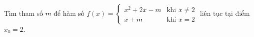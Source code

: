 \begin{ex}
Tìm tham số $m$ để hàm số $f(x)=\begin{cases}x^2+2x-m&\text{khi }x\ne2\\x+m&\text{khi }x=2\end{cases}$ liên tục tại điểm $x_0=2$.
\end{ex}

